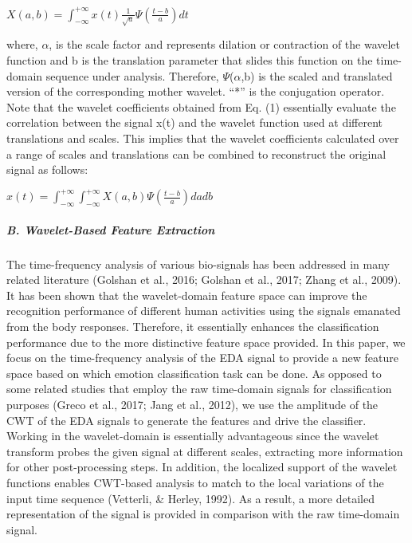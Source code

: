 $X(a,b) = \int_{-\infty}^{+\infty}x(t)\frac{1}{\sqrt{a}} \Psi (\frac{t-b}{a}) dt$\newline

where, $\alpha$, is the scale factor and represents dilation or contraction of the wavelet 
function and b is the translation parameter that slides this function on the 
time-domain sequence under analysis. Therefore, $\Psi$($\alpha$,b) is the scaled and translated 
version of the corresponding mother wavelet. “*” is the conjugation operator.
Note that the wavelet coefficients obtained from Eq. (1) essentially evaluate the 
correlation between the signal x(t) and the wavelet function used at different 
translations and scales. This implies that the wavelet coefficients calculated 
over a range of scales and translations can be combined to reconstruct the original 
signal as follows:

$x(t) = \int_{-\infty}^{+\infty} \int_{-\infty}^{+\infty} X(a,b) \Psi (\frac{t-b}{a}) dadb$\newline

\subparagraph{B. Wavelet-Based Feature Extraction}
The time-frequency analysis of various bio-signals has been addressed in many 
related literature (Golshan et al., 2016; Golshan et al., 2017; Zhang et al., 2009). 
It has been shown that the wavelet-domain feature space can improve the recognition 
performance of different human activities using the signals emanated from the body 
responses. Therefore, it essentially enhances the classification performance due to 
the more distinctive feature space provided. 
In this paper, we focus on the time-frequency analysis of the EDA signal to provide 
a new feature space based on which emotion classification task can be done. As 
opposed to some related studies that employ the raw time-domain signals for 
classification purposes (Greco et al., 2017; Jang et al., 2012), we use the 
amplitude of the CWT of the EDA signals to generate the features and drive the 
classifier. Working in the wavelet-domain is essentially advantageous since the 
wavelet transform probes the given signal at different scales, extracting more 
information for other post-processing steps. In addition, the localized support 
of the wavelet functions enables CWT-based analysis to match to the local variations 
of the input time sequence (Vetterli, \& Herley, 1992). As a result, a more detailed 
representation of the signal is provided in comparison with the raw time-domain signal.

